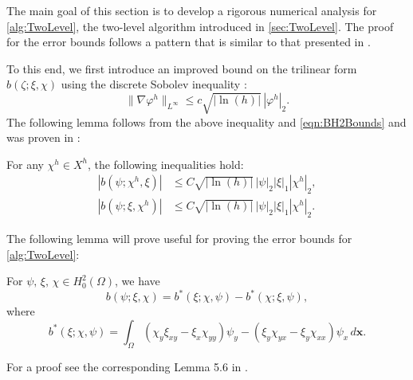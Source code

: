 The main goal of this section is to develop a rigorous numerical analysis for
\autoref{alg:TwoLevel}, the two-level algorithm introduced in
\autoref{sec:TwoLevel}. The proof for the error bounds follows a pattern that is
similar to that presented in \cite{Fairag98}.

To this end, we first introduce an improved bound on the trilinear form
$b(\zeta; \xi, \chi)$ using the discrete Sobolev inequality
\cite{Ciarlet,Fairag98}:
\begin{equation*}
  \|\nabla \varphi^h\|_{L^{\infty}} \le c \sqrt{|\ln(h)|}\, |\varphi^h|_2.
\end{equation*}
The following lemma follows from the above inequality and \eqref{eqn:BH2Bounds}
and was proven in \cite{Fairag98}:
\begin{lemma} \label{lma:bImproved}
  For any $\chi^h\in X^h$, the following inequalities hold:
  \begin{align*}
    |b(\psi;\chi^h,\xi)| &\le C\sqrt{|\ln(h)|} \, |\psi|_2 |\xi|_1 |\chi^h|_2, \\
    |b(\psi;\xi,\chi^h)| &\le C\sqrt{|\ln(h)|} \, |\psi|_2 |\xi|_1 |\chi^h|_2.
  \end{align*}
\end{lemma}
The following lemma will prove useful for proving the error bounds for
\autoref{alg:TwoLevel}:
\begin{lemma} \label{lma:trilinear}
  For $\psi,\,\xi,\,\chi\in H^2_0(\Omega)$, we have
  \begin{equation}
    b(\psi; \xi, \chi) = b^*(\xi; \chi, \psi) - b^*(\chi; \xi, \psi),
    \label{eqn:eqn:trilinear}
  \end{equation}
  where
  \begin{equation}
    b^*(\xi; \chi, \psi) = \int_{\Omega}\! (\chi_y\xi_{xy}-\xi_x\chi_{yy}) \psi_y -
    (\xi_y\chi_{yx}-\xi_y\chi_{xx}) \psi_x \,d\mathbf{x}.
    \label{eqn:trilinear}
  \end{equation}
\end{lemma}
For a proof see the corresponding Lemma 5.6 in \cite{Fairag98}.

